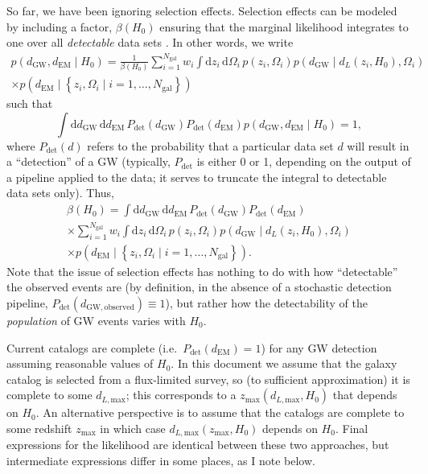 \documentclass[modern]{aastex62}
\newcommand{\dd}{\mathrm{d}}
\newcommand{\dEM}{d_{\mathrm{EM}}}
\newcommand{\dGW}{d_{\mathrm{GW}}}
\newcommand{\Ngal}{N_{\mathrm{gal}}}
\newcommand{\Pdet}{P_{\mathrm{det}}}
\begin{document}
So far, we have been ignoring selection effects.  Selection effects can be
modeled by including a factor, $\beta\left( H_0 \right)$ ensuring that the
marginal likelihood integrates to one over all \emph{detectable} data sets
\citep{Mandel2018}.  In other words, we write
%
\begin{multline}
    p\left( \dGW, \dEM \mid H_0 \right) = \frac{1}{\beta\left( H_0 \right)} \sum_{i=1}^{\Ngal} w_i \int \dd z_i \, \dd \Omega_i \, p\left( z_i, \Omega_i \right) p\left( \dGW \mid d_L\left( z_i, H_0 \right), \Omega_i \right) \\ \times p\left( \dEM \mid \left\{ z_i, \Omega_i \mid i = 1, \ldots, \Ngal \right\} \right)
\end{multline}
%
such that
\begin{equation}
    \int \dd \dGW \, \dd \dEM \, \Pdet\left( \dGW \right) \Pdet\left( \dEM \right) p\left( \dGW, \dEM \mid H_0 \right) = 1,
\end{equation}
%
where $\Pdet\left(d\right)$ refers to the probability that a particular data set
$d$ will result in a ``detection'' of a \ac{GW} (typically, $\Pdet$ is either 0
or 1, depending on the output of a pipeline applied to the data; it serves to
truncate the integral to detectable data sets only).  Thus,
%
\begin{multline}
    \label{eq:beta-H0-full-def}
    \beta\left( H_0 \right) =  \int \dd \dGW \, \dd \dEM \, \Pdet\left( \dGW \right) \Pdet\left( \dEM \right) \\ \times \sum_{i=1}^{\Ngal} w_i \int \dd z_i \, \dd \Omega_i \, p\left( z_i, \Omega_i \right) p\left( \dGW \mid d_L\left( z_i, H_0 \right), \Omega_i \right) \\ \times p\left( \dEM \mid \left\{ z_i, \Omega_i \mid i = 1, \ldots, \Ngal \right\} \right).
\end{multline}
%
Note that the issue of selection effects has nothing to do with how
``detectable'' the observed events are (by definition, in the absence of a
stochastic detection pipeline, $\Pdet\left( d_{\mathrm{GW},\mathrm{observed}}
\right) \equiv 1$), but rather how the detectability of the \emph{population} of
\ac{GW} events varies with $H_0$.

Current catalogs are complete (i.e.\ $\Pdet\left( \dEM \right) = 1$) for any
\ac{GW} detection assuming reasonable values of $H_0$.  In this document we
assume that the galaxy catalog is selected from a flux-limited survey, so (to
sufficient approximation) it is complete to some $d_{L, \mathrm{max}}$; this
corresponds to a $z_{\mathrm{max}}\left( d_{L,\mathrm{max}}, H_0 \right)$ that
depends on $H_0$.  An alternative perspective is to assume that the catalogs are
complete to some redshift $z_\mathrm{max}$ in which case
$d_{L,\mathrm{max}}\left( z_\mathrm{max}, H_0 \right)$ depends on $H_0$.  Final
expressions for the likelihood are identical between these two approaches, but
intermediate expressions differ in some places, as I note below.
\end{document}
